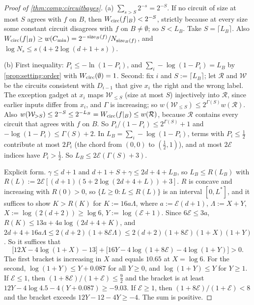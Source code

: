 \begin{proof}[Proof of \cref{thm:comp:circuitbayes}]
(a) $\sum_{s>S}2^{-s}=2^{-S}$. If no circuit of size at most $S$ agrees with $f$ on $B$, then $W_{\mathrm{circ}}(f|_B)<2^{-S}$, strictly because at every size some constant circuit disagrees with $f$ on $B\ne\emptyset$; so $S<L_B$. Take $S=\lceil L_B\rceil$. Also $W_{\mathrm{circ}}(f|_B)\ge w(C_{\min})=2^{-\operatorname{size}_B(f)}/N_{\operatorname{size}_B(f)}$, and $\log N_s\le s(4+2\log(d+1+s))$.

(b) First inequality: $P_i\le-\ln(1-P_i)$, and $\sum_i-\log(1-P_i)=L_B$ by \cref{prop:setting:order} with $W_{\mathrm{circ}}(\emptyset)=1$. Second: fix $i$ and $S:=\lceil L_B\rceil$; let $\mathcal R$ and $\mathcal W$ be the circuits consistent with $D_{i-1}$ that give $x_i$ the right and the wrong label. The exception gadget at $x_i$ maps $\mathcal W_{\le S}$ (size at most $S$) injectively into $\mathcal R$, since earlier inputs differ from $x_i$, and $\Gamma$ is increasing; so $w(\mathcal W_{\le S})\le2^{\Gamma(S)}w(\mathcal R)$. Also $w(\mathcal W_{>S})\le2^{-S}\le2^{-L_B}=W_{\mathrm{circ}}(f|_B)\le w(\mathcal R)$, because $\mathcal R$ contains every circuit that agrees with $f$ on $B$. So $P_i/(1-P_i)\le2^{\Gamma(S)}+1$ and $-\log(1-P_i)\le\Gamma(S)+2$. In $L_B=\sum_i-\log(1-P_i)$, terms with $P_i\le\frac12$ contribute at most $2P_i$ (the chord from $(0,0)$ to $(\frac12,1)$), and at most $2\mathcal E$ indices have $P_i>\frac12$. So $L_B\le2\mathcal E(\Gamma(S)+3)$.

Explicit form. $\gamma\le d+1$ and $d+1+S+\gamma\le2d+4+L_B$, so $L_B\le R(L_B)$ with $R(L):=2\mathcal E[(d+1)(5+2\log(2d+4+L))+3]$. $R$ is concave and increasing with $R(0)>0$, so $\{L\ge0:L\le R(L)\}$ is an interval $[0,L^*]$, and it suffices to show $K>R(K)$ for $K:=16a\Lambda$, where $a:=\mathcal E(d+1)$, $\Lambda:=X+Y$, $X:=\log(2(d+2))\ge\log6$, $Y:=\log(\mathcal E+1)$. Since $6\mathcal E\le3a$, $R(K)\le13a+4a\log(2d+4+K)$, and $2d+4+16a\Lambda\le2(d+2)(1+8\mathcal E\Lambda)\le2(d+2)(1+8\mathcal E)(1+X)(1+Y)$. So it suffices that
\[ \big[12X-4\log(1+X)-13\big]+\big[16Y-4\log(1+8\mathcal E)-4\log(1+Y)\big]>0. \]
The first bracket is increasing in $X$ and equals $10.65$ at $X=\log6$. For the second, $\log(1+Y)\le Y+0.087$ for all $Y\ge0$, and $\log(1+Y)\le Y$ for $Y\ge1$. If $\mathcal E\le1$, then $(1+8\mathcal E)/(1+\mathcal E)\le\frac92$ and the bracket is at least $12Y-4\log4.5-4(Y+0.087)\ge-9.03$. If $\mathcal E\ge1$, then $(1+8\mathcal E)/(1+\mathcal E)<8$ and the bracket exceeds $12Y-12-4Y\ge-4$. The sum is positive.
\end{proof}

